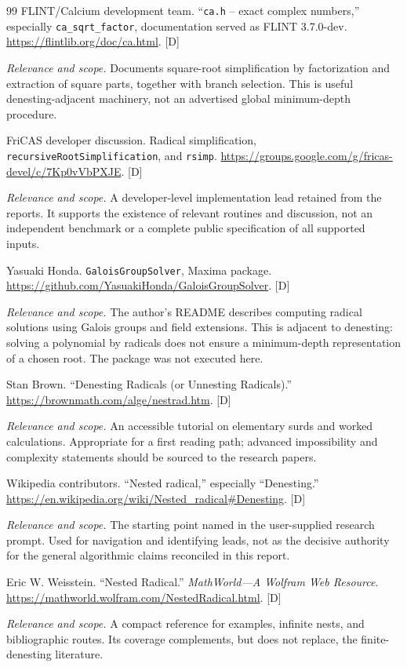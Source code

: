 \documentclass[11pt,letterpaper]{article}
\numberwithin{equation}{section}
\theoremstyle{definition}
\theoremstyle{remark}
\newcommand{\status}[1]{\textsf{\small[#1]}}
\newcommand{\entrynote}[1]{\par\smallskip\noindent\emph{Relevance and scope.} #1}
\begin{document}
\begin{thebibliography}{99}
FLINT/Calcium development team. ``\texttt{ca.h} -- exact complex numbers,'' especially \texttt{ca\_sqrt\_factor}, documentation served as FLINT 3.7.0-dev. \url{https://flintlib.org/doc/ca.html}. \status{D}
\entrynote{Documents square-root simplification by factorization and extraction of square parts, together with branch selection. This is useful denesting-adjacent machinery, not an advertised global minimum-depth procedure.}

FriCAS developer discussion. Radical simplification, \texttt{recursiveRootSimplification}, and \texttt{rsimp}. \url{https://groups.google.com/g/fricas-devel/c/7Kp0vVbPXJE}. \status{D}
\entrynote{A developer-level implementation lead retained from the reports. It supports the existence of relevant routines and discussion, not an independent benchmark or a complete public specification of all supported inputs.}

Yasuaki Honda. \texttt{GaloisGroupSolver}, Maxima package. \url{https://github.com/YasuakiHonda/GaloisGroupSolver}. \status{D}
\entrynote{The author's README describes computing radical solutions using Galois groups and field extensions. This is adjacent to denesting: solving a polynomial by radicals does not ensure a minimum-depth representation of a chosen root. The package was not executed here.}

Stan Brown. ``Denesting Radicals (or Unnesting Radicals).'' \url{https://brownmath.com/alge/nestrad.htm}. \status{D}
\entrynote{An accessible tutorial on elementary surds and worked calculations. Appropriate for a first reading path; advanced impossibility and complexity statements should be sourced to the research papers.}

Wikipedia contributors. ``Nested radical,'' especially ``Denesting.'' \url{https://en.wikipedia.org/wiki/Nested_radical#Denesting}. \status{D}
\entrynote{The starting point named in the user-supplied research prompt. Used for navigation and identifying leads, not as the decisive authority for the general algorithmic claims reconciled in this report.}

Eric W. Weisstein. ``Nested Radical.'' \emph{MathWorld---A Wolfram Web Resource}. \url{https://mathworld.wolfram.com/NestedRadical.html}. \status{D}
\entrynote{A compact reference for examples, infinite nests, and bibliographic routes. Its coverage complements, but does not replace, the finite-denesting literature.}


\end{thebibliography}
\end{document}

